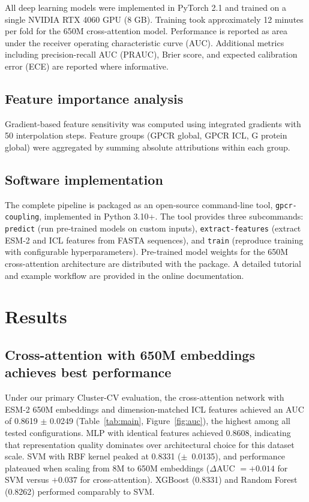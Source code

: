 \documentclass[11pt,a4paper]{article}
\begin{document}
All deep learning models were implemented in PyTorch 2.1 \cite{paszke2019pytorch} and trained on a single NVIDIA RTX 4060 GPU (8 GB). Training took approximately 12 minutes per fold for the 650M cross-attention model. Performance is reported as area under the receiver operating characteristic curve (AUC). Additional metrics including precision-recall AUC (PRAUC), Brier score, and expected calibration error (ECE) are reported where informative.

\subsection{Feature importance analysis}

Gradient-based feature sensitivity was computed using integrated gradients \cite{sundararajan2017axiomatic} with 50 interpolation steps. Feature groups (GPCR global, GPCR ICL, G protein global) were aggregated by summing absolute attributions within each group.

\subsection{Software implementation}

The complete pipeline is packaged as an open-source command-line tool, \texttt{gpcr-coupling}, implemented in Python 3.10+. The tool provides three subcommands: \texttt{predict} (run pre-trained models on custom inputs), \texttt{extract-features} (extract ESM-2 and ICL features from FASTA sequences), and \texttt{train} (reproduce training with configurable hyperparameters). Pre-trained model weights for the 650M cross-attention architecture are distributed with the package. A detailed tutorial and example workflow are provided in the online documentation.

\section{Results}

\subsection{Cross-attention with 650M embeddings achieves best performance}

Under our primary Cluster-CV evaluation, the cross-attention network with ESM-2 650M embeddings and dimension-matched ICL features achieved an AUC of 0.8619 $\pm$ 0.0249 (Table~\ref{tab:main}, Figure~\ref{fig:auc}), the highest among all tested configurations. MLP with identical features achieved 0.8608, indicating that representation quality dominates over architectural choice for this dataset scale. SVM with RBF kernel peaked at 0.8331 \mbox{($\pm$ 0.0135)}, and performance plateaued when scaling from 8M to 650M embeddings ($\Delta$AUC $= +0.014$ for SVM versus $+0.037$ for cross-attention). XGBoost (0.8331) and Random Forest (0.8262) performed comparably to SVM.
\end{document}
